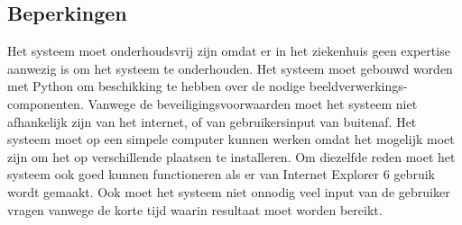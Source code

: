 \subsection{Beperkingen}
Het systeem moet onderhoudsvrij zijn omdat er in het ziekenhuis geen expertise aanwezig is om het systeem te onderhouden.
Het systeem moet gebouwd worden met Python om beschikking te hebben over de nodige beeldverwerkings-componenten.
Vanwege de beveiligingsvoorwaarden moet het systeem niet afhankelijk zijn van het internet, of van gebruikersinput van buitenaf.
Het systeem moet op een simpele computer kunnen werken omdat het mogelijk moet zijn om het op verschillende plaatsen te installeren.
Om diezelfde reden moet het systeem ook goed kunnen functioneren als er van Internet Explorer 6 gebruik wordt gemaakt.
Ook moet het systeem niet onnodig veel input van de gebruiker vragen vanwege de korte tijd waarin resultaat moet worden bereikt.
